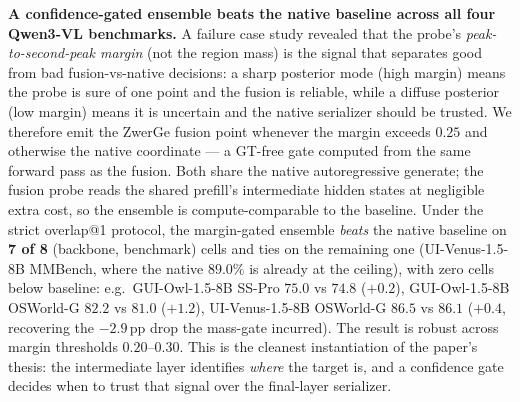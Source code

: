 \textbf{A confidence-gated ensemble beats the native baseline across all four Qwen3-VL benchmarks.}
A failure case study revealed that the probe's \emph{peak-to-second-peak margin} (not the region mass) is the signal that separates good from bad fusion-vs-native decisions: a sharp posterior mode (high margin) means the probe is sure of one point and the fusion is reliable, while a diffuse posterior (low margin) means it is uncertain and the native serializer should be trusted. We therefore emit the ZwerGe fusion point whenever the margin exceeds $0.25$ and otherwise the native coordinate --- a GT-free gate computed from the same forward pass as the fusion. Both share the native autoregressive generate; the fusion probe reads the shared prefill's intermediate hidden states at negligible extra cost, so the ensemble is compute-comparable to the baseline. Under the strict overlap@1 protocol, the margin-gated ensemble \emph{beats} the native baseline on \textbf{7 of 8} (backbone, benchmark) cells and ties on the remaining one (UI-Venus-1.5-8B MMBench, where the native $89.0\%$ is already at the ceiling), with zero cells below baseline: e.g.\ GUI-Owl-1.5-8B SS-Pro $75.0$ vs $74.8$ ($+0.2$), GUI-Owl-1.5-8B OSWorld-G $82.2$ vs $81.0$ ($+1.2$), UI-Venus-1.5-8B OSWorld-G $86.5$ vs $86.1$ ($+0.4$, recovering the $-2.9$\,pp drop the mass-gate incurred). The result is robust across margin thresholds $0.20$--$0.30$. This is the cleanest instantiation of the paper's thesis: the intermediate layer identifies \emph{where} the target is, and a confidence gate decides when to trust that signal over the final-layer serializer.

